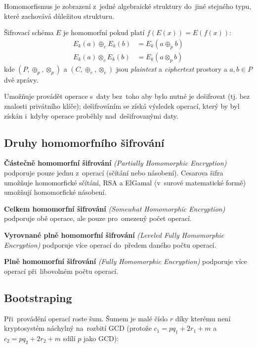 Homomorfismus je zobrazení z~jedné algebraické struktury do~jiné stejného typu, které zachovává důležitou strukturu.

Šifrovací schéma $E$ je homomorfní pokud platí $f(E(x)) = E(f(x))$:
\begin{align*}
    E_k(a) \oplus_c E_k(b) &= E_k (a \oplus_p b)
    \\
    E_k(a) \otimes_c E_k(b) &= E_k(a \otimes_p b)
\end{align*}
\noindent
kde $(P, \oplus_p, \otimes_p)$ a $(C, \oplus_c, \otimes_c)$ jsou \emph{plaintext} a \emph{ciphertext} prostory a $a, b \in P$ dvě zprávy.

Umožňuje provádět operace s~daty bez~toho aby bylo nutné je dešifrovat (tj. bez znalosti privátního klíče); dešifrováním se získá výsledek operací, který by byl získán i~kdyby operace proběhly nad~dešifrovanými daty.

\subsection{Druhy homomorfního šifrování}


\textbf{Částečně homomorfní šifrování} \emph{(Partially Homomorphic Encryption)} podporuje pouze jednu z~operací (sčítání nebo násobení).
Cesarova šifra umožňuje homomorfické sčítání, RSA a ElGamal (v~surové matematické formě) umožňují homomorfické násobení.

\textbf{Celkem homomorfní šifrování} \emph{(Somewhat Homomorphic Encryption)} podporuje obě operace, ale pouze pro~omezený počet operací.

\textbf{Vyrovnané plně homomorfní šifrování} \emph{(Leveled Fully Homomorphic Encryption)} podporuje více operací do~předem daného počtu operací.

\textbf{Plně homomorfní šifrování} \emph{(Fully Homomorphic Encryption)} podporuje více operací při~libovolném počtu operací.


\subsection{Bootstraping}

Při~provádění operací roste šum. Šumem je malé číslo $r$ díky kterému není kryptosystém náchylný na~rozbití GCD (protože $c_1 = pq_1 + 2r_1 + m$ a $c_2 = pq_2 + 2r_2 + m$ sdílí $p$ jako GCD):


